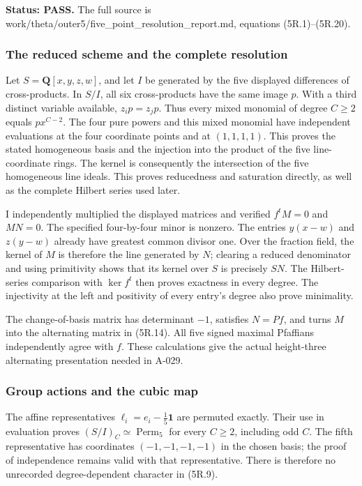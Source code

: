 \documentclass[
  10pt,
]{article}
\begin{document}
\textbf{Status: PASS.} The full source is
work/theta/outer5/five\_point\_resolution\_report.md, equations
(5R.1)--(5R.20).

\subsubsection{The reduced scheme and the complete
resolution}\label{the-reduced-scheme-and-the-complete-resolution}

Let \(S=\mathbf Q[x,y,z,w]\), and let \(I\) be generated by the five
displayed differences of cross-products. In \(S/I\), all six
cross-products have the same image \(p\). With a third distinct variable
available, \(z_i p=z_jp\). Thus every mixed monomial of degree \(C\ge2\)
equals \(px^{C-2}\). The four pure powers and this mixed monomial have
independent evaluations at the four coordinate points and at
\((1,1,1,1)\). This proves the stated homogeneous basis and the
injection into the product of the five line-coordinate rings. The kernel
is consequently the intersection of the five homogeneous line ideals.
This proves reducedness and saturation directly, as well as the complete
Hilbert series used later.

I independently multiplied the displayed matrices and verified
\(f^tM=0\) and \(MN=0\). The specified four-by-four minor is nonzero.
The entries \(y(x-w)\) and \(z(y-w)\) already have greatest common
divisor one. Over the fraction field, the kernel of \(M\) is therefore
the line generated by \(N\); clearing a reduced denominator and using
primitivity shows that its kernel over \(S\) is precisely \(SN\). The
Hilbert-series comparison with \(\ker f^t\) then proves exactness in
every degree. The injectivity at the left and positivity of every
entry's degree also prove minimality.

The change-of-basis matrix has determinant \(-1\), satisfies \(N=Pf\),
and turns \(M\) into the alternating matrix in (5R.14). All five signed
maximal Pfaffians independently agree with \(f\). These calculations
give the actual height-three alternating presentation needed in A-029.

\subsubsection{Group actions and the cubic
map}\label{group-actions-and-the-cubic-map}

The affine representatives \(\ell_i=e_i-\frac15\mathbf1\) are permuted
exactly. Their use in evaluation proves
\((S/I)_C\simeq\operatorname{Perm}_5\) for every \(C\ge2\), including
odd \(C\). The fifth representative has coordinates \((-1,-1,-1,-1)\) in
the chosen basis; the proof of independence remains valid with that
representative. There is therefore no unrecorded degree-dependent
character in (5R.9).
\end{document}
